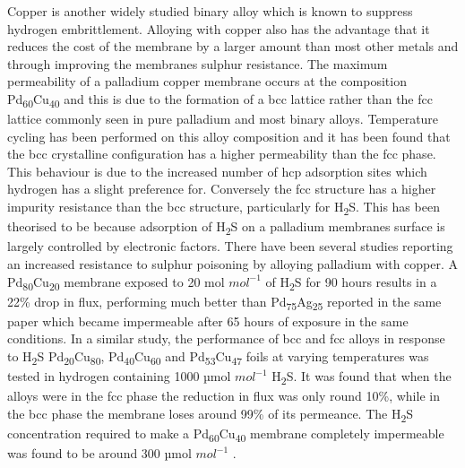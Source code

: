 Copper is another widely studied binary alloy which is known to suppress hydrogen 
embrittlement. Alloying with copper also has the advantage that it reduces the cost of the 
membrane by a larger amount than most other metals and through improving the membranes 
sulphur resistance. The maximum permeability of a palladium copper membrane occurs at the 
composition Pd\textsubscript{60}Cu\textsubscript{40} and this is due to the formation of a 
bcc lattice rather than the fcc lattice commonly seen in pure palladium and most binary 
alloys. \cite{She2014} Temperature cycling has been performed on this alloy composition and it has been 
found that the bcc crystalline configuration has a higher permeability than the fcc phase. \cite{Dolan2010} 
This behaviour is due to the increased number of hcp adsorption sites which hydrogen has a 
slight preference for.\cite{Wilcox2010} Conversely the fcc structure has a higher impurity resistance 
than the bcc structure, particularly for H\textsubscript{2}S. This has been theorised to be because 
adsorption of H\textsubscript{2}S on a palladium membranes surface is largely controlled by electronic 
factors.\cite{D.T.Hughes1978a} There have been several studies reporting an increased resistance to sulphur 
poisoning by alloying palladium with copper. A Pd\textsubscript{80}Cu\textsubscript{20} 
membrane exposed to 20 \textmu mol $mol^{-1}$ of H\textsubscript{2}S for 90 hours results in a 
22\% drop in flux, performing much better than Pd\textsubscript{75}Ag\textsubscript{25} reported in the same paper which 
became impermeable after 65 hours of exposure in the same conditions.\cite{Mundschau2006} In a similar study, 
the performance of bcc and fcc alloys in response to H\textsubscript{2}S 
Pd\textsubscript{20}Cu\textsubscript{80}, Pd\textsubscript{40}Cu\textsubscript{60} and 
Pd\textsubscript{53}Cu\textsubscript{47} foils at varying temperatures was tested in 
hydrogen containing 1000 µmol $mol^{-1}$  H\textsubscript{2}S.\cite{OB2010} It was found that when the alloys were in the 
fcc phase the reduction in flux was only round 10\%, while in the bcc phase the membrane 
loses around 99\% of its permeance. The H\textsubscript{2}S concentration required to make a 
Pd\textsubscript{60}Cu\textsubscript{40} membrane completely impermeable was found to be around 300 µmol $mol^{-1}$ \cite{Kulprathipanja2005}.

